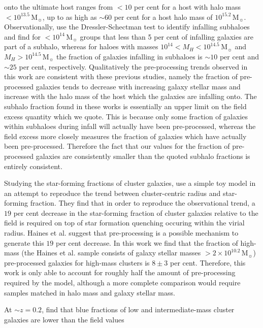 \documentclass[a4paper,fleqn,usenatbib]{mnras}
\newcommand{\Msun}{\,\mathrm{M_{\sun}}}
\begin{document}
onto the ultimate host ranges from $<10$ per cent for a host with halo
mass $<\!10^{13.5}\Msun$, up to as high as $\sim\!60$ per cent for a
host halo mass of $10^{15.2}\Msun$.
Observationally, \citet{hou2014} use the
Dressler-Schectman test \citep{dressler1988} to identify infalling
subhaloes and find for $<\!10^{14}\Msun$ groups that less than 5 per
cent of infalling galaxies are part of a subhalo, whereas for haloes
with masses $10^{14} < M_H < 10^{14.5}\Msun$ and $M_H >
10^{14.5}\Msun$ the fraction of galaxies infalling in subhaloes is
$\sim 10$ per cent and $\sim 25$ per cent, respectively.
Qualitatively the pre-processing trends observed in this work are
consistent with these previous studies, namely the fraction of
pre-processed galaxies tends to decrease with increasing galaxy stellar mass and
increase with the halo mass of the host which the galaxies are
infalling onto.  The subhalo fraction found in these works is
essentially an upper limit on the field excess quantity which we
quote.  This is because only some fraction of galaxies within subhaloes
during infall will actually have been pre-processed, whereas the
field excess more closely measures the fraction of galaxies
which have actually been pre-processed.  Therefore the fact that our
values for the fraction of pre-processed galaxies are consistently
smaller than the quoted subhalo fractions is entirely consistent.
\par
Studying the star-forming fractions of cluster galaxies,
\citet{haines2015} use a simple toy model in an attempt to reproduce the
trend between cluster-centric radius and star-forming fraction.  They
find that in order to reproduce the observational trend, a $19$ per
cent decrease in the star-forming fraction of cluster galaxies relative to
the field is required on top of star
formation quenching occuring within the virial radius.  Haines et
al. suggest that pre-processing is a possible mechanism to generate
this $19$ per cent decrease.  In this work we find that the fraction of
high-mass (the Haines et al. sample consists of galaxy stellar masses
$>\!2 \times 10^{10.2}\Msun$) pre-processed galaxies for high-mass
clusters is $8 \pm 3$ per cent.  Therefore, this work is only able to
account for roughly half the amount of pre-processing required by the
\citet{haines2015} model, although a more complete comparison would
require samples matched in halo mass and galaxy stellar mass.
\par
At $\sim\!z=0.2$, \citet{lu2012} find that blue fractions of low and
intermediate-mass cluster galaxies are lower than the field values
\end{document}
